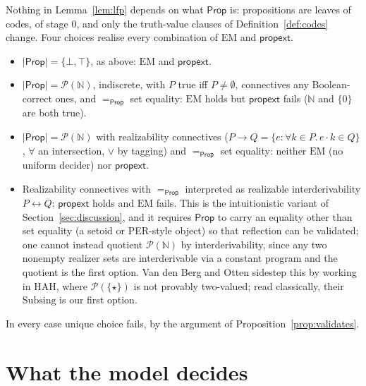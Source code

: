 \documentclass[10pt]{article}
\newcommand{\N}{\mathbb{N}}
\newcommand{\Prop}{\mathsf{Prop}}
\newcommand{\HAH}{\mathrm{HAH}}
\newcommand{\EM}{\mathrm{EM}}
\newcommand{\ap}{\cdot}
\newcommand{\PP}{\mathcal{P}}
\begin{document}
\begin{remark}[other choices of $\Prop$]\label{rem:prop}
Nothing in Lemma~\ref{lem:lfp} depends on what $\Prop$ is: propositions
are leaves of codes, of stage $0$, and only the truth-value clauses of
Definition~\ref{def:codes} change. Four choices realise every combination
of $\EM$ and $\mathsf{propext}$.
\begin{itemize}
\item $|\Prop|=\{\bot,\top\}$, as above: $\EM$ and $\mathsf{propext}$.
\item $|\Prop|=\PP(\N)$, indiscrete, with $P$ true iff $P\ne\emptyset$,
  connectives any Boolean-correct ones, and $=_\Prop$ set equality: $\EM$
  holds but $\mathsf{propext}$ fails ($\N$ and $\{0\}$ are both true).
\item $|\Prop|=\PP(\N)$ with realizability connectives
  ($P\to Q=\{e:\forall k\in P.\,e\ap k\in Q\}$, $\forall$ an intersection,
  $\vee$ by tagging) and $=_\Prop$ set equality: neither $\EM$ (no uniform
  decider) nor $\mathsf{propext}$.
\item Realizability connectives with $=_\Prop$ interpreted as realizable
  interderivability $P\leftrightarrow Q$: $\mathsf{propext}$ holds and $\EM$
  fails. This is the intuitionistic variant of Section~\ref{sec:discussion},
  and it requires $\Prop$ to carry an equality other than set equality (a
  setoid or PER-style object) so that reflection can be validated; one
  cannot instead quotient $\PP(\N)$ by interderivability, since any two
  nonempty realizer sets are interderivable via a constant program and the
  quotient is the first option. Van den Berg and Otten sidestep this by
  working in $\HAH$, where $\PP(\{\star\})$ is not provably two-valued;
  read classically, their $\mathrm{Subsing}$ is our first option.
\end{itemize}
In every case unique choice fails, by the argument of
Proposition~\ref{prop:validates}.
\end{remark}

\section{What the model decides}\label{sec:decides}
\end{document}
